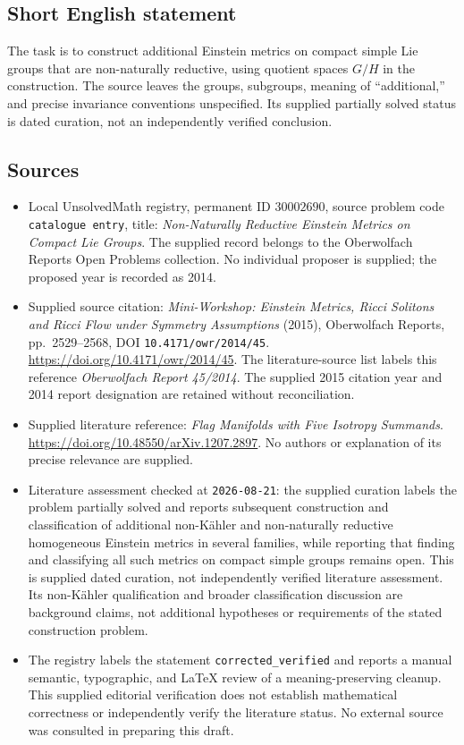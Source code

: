 \documentclass[11pt]{article}
\begin{document}
\subsection{Short English statement}
The task is to construct additional Einstein metrics on compact simple Lie groups that are non-naturally reductive, using quotient spaces \(G/H\) in the construction. The source leaves the groups, subgroups, meaning of ``additional,'' and precise invariance conventions unspecified. Its supplied partially solved status is dated curation, not an independently verified conclusion.
\subsection{Sources}
\begin{itemize}
\item Local UnsolvedMath registry, permanent ID \(30002690\), source problem code \texttt{catalogue entry}, title: \emph{Non-Naturally Reductive Einstein Metrics on Compact Lie Groups}. The supplied record belongs to the Oberwolfach Reports Open Problems collection. No individual proposer is supplied; the proposed year is recorded as 2014.
\item Supplied source citation: \emph{Mini-Workshop: Einstein Metrics, Ricci Solitons and Ricci Flow under Symmetry Assumptions} (2015), Oberwolfach Reports, pp.\ 2529--2568, DOI \texttt{10.4171/owr/2014/45}. \url{https://doi.org/10.4171/owr/2014/45}. The literature-source list labels this reference \emph{Oberwolfach Report 45/2014}. The supplied 2015 citation year and 2014 report designation are retained without reconciliation.
\item Supplied literature reference: \emph{Flag Manifolds with Five Isotropy Summands}. \url{https://doi.org/10.48550/arXiv.1207.2897}. No authors or explanation of its precise relevance are supplied.
\item Literature assessment checked at \texttt{2026-08-21}: the supplied curation labels the problem partially solved and reports subsequent construction and classification of additional non-K\"ahler and non-naturally reductive homogeneous Einstein metrics in several families, while reporting that finding and classifying all such metrics on compact simple groups remains open. This is supplied dated curation, not independently verified literature assessment. Its non-K\"ahler qualification and broader classification discussion are background claims, not additional hypotheses or requirements of the stated construction problem.
\item The registry labels the statement \texttt{corrected\_verified} and reports a manual semantic, typographic, and LaTeX review of a meaning-preserving cleanup. This supplied editorial verification does not establish mathematical correctness or independently verify the literature status. No external source was consulted in preparing this draft.
\end{itemize}
\end{document}
